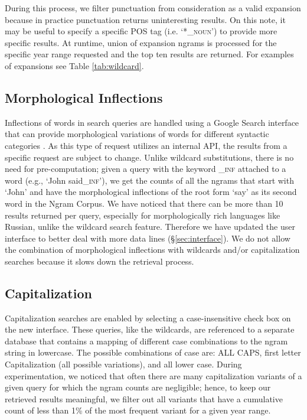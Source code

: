 \documentclass[11pt,a4paper]{article}
\begin{document}
	During this process, we filter punctuation from consideration as a valid expansion because in practice punctuation returns uninteresting results. On this note, it may be useful to specify a specific POS tag (i.e. `*\textsf{\textsc{\_noun}}') to provide more specific results. At runtime, union of expansion ngrams is processed for the specific year range requested and the top ten results are returned. For examples of expansions see Table \ref{tab:wildcard}. 


\subsection{Morphological Inflections}
Inflections of words in search queries are handled using a Google Search interface that can provide morphological variations of words for different syntactic categories \cite{durrett2013supervised}. As this type of request utilizes an internal API, the results from a specific request are subject to change. Unlike wildcard substitutions, there is no need for pre-computation; given a query with the keyword \textsf{\textsc{\_inf}} attached to a word (e.g., `John said\textsf{\textsc{\_inf}}'), we get the counts of all the ngrams that start with `John' and have the morphological inflections of the root form `say' as its second word in the Ngram Corpus. We have noticed that there can be more than 10 results returned per query, especially for morphologically rich languages like Russian, unlike the wildcard search feature. Therefore we have updated the user interface to better deal with more data lines (\S\ref{sec:interface}). We do not allow the combination of morphological inflections with wildcards and/or capitalization searches
because it slows down the retrieval process.

\subsection{Capitalization}
Capitalization searches are enabled by selecting a case-insensitive check box on the new interface. These queries, like the wildcards, are referenced to a separate database that contains a mapping of different case combinations to the ngram string in lowercase. The possible combinations of case are: ALL CAPS, first letter Capitalization (all possible variations), and all lower case. During experimentation, we noticed that often there are many capitalization variants of a given query for which the ngram counts are negligible; hence, to keep our retrieved results meaningful, we filter out all variants that have a cumulative count of less than 1\% of the most frequent variant for a given year range.
\end{document}
